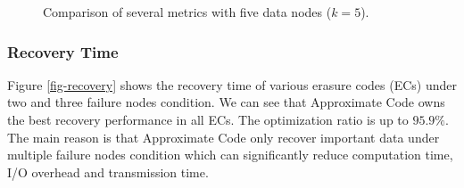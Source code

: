 \documentclass[sigconf]{acmart}
\begin{document}
\begin{figure}[ht]
\hspace{-3mm}
\hspace{-3mm}
\hspace{-3mm}

\caption{Comparison of several metrics with five data nodes ($k=5$).}\label{fig-BAR}

\end{figure}

\subsubsection{Recovery Time}

Figure \ref{fig-recovery} shows the recovery time of various erasure codes (ECs) under two and three failure nodes
condition. We can see that Approximate Code owns the best recovery performance in all ECs. The optimization ratio is up to $95.9\%$.
The main reason is that Approximate Code only recover important data under multiple failure nodes condition which can significantly reduce computation time, I/O overhead and transmission time.
\end{document}
